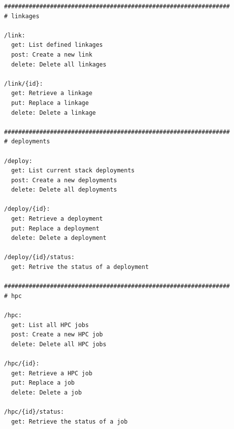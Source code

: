 \documentclass[11pt]{article}
\begin{document}
\begin{verbatim}
  ################################################################
  # linkages

  /link:
    get: List defined linkages
    post: Create a new link
    delete: Delete all linkages

  /link/{id}:
    get: Retrieve a linkage
    put: Replace a linkage
    delete: Delete a linkage

  ################################################################
  # deployments

  /deploy:
    get: List current stack deployments
    post: Create a new deployments
    delete: Delete all deployments

  /deploy/{id}:
    get: Retrieve a deployment
    put: Replace a deployment
    delete: Delete a deployment

  /deploy/{id}/status:
    get: Retrive the status of a deployment

  ################################################################
  # hpc

  /hpc:
    get: List all HPC jobs
    post: Create a new HPC job
    delete: Delete all HPC jobs

  /hpc/{id}:
    get: Retrieve a HPC job
    put: Replace a job
    delete: Delete a job

  /hpc/{id}/status:
    get: Retrieve the status of a job
\end{verbatim}


 
\end{document}
